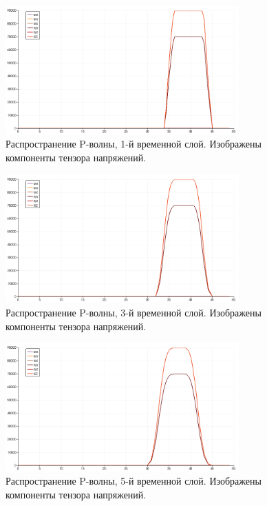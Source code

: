 \begin{figure}[htp]
\centering
\includegraphics[width=0.8\textwidth]{png/p-wave-test/s/0001.png}
\caption{Распространение P-волны, 1-й временной слой. Изображены компоненты тензора напряжений.}
\label{pic:p_wave_1}
\end{figure}

\begin{figure}[htp]
\centering
\includegraphics[width=0.8\textwidth]{png/p-wave-test/s/0003.png}
\caption{Распространение P-волны, 3-й временной слой. Изображены компоненты тензора напряжений.}
\end{figure}

\begin{figure}[htp]
\centering
\includegraphics[width=0.8\textwidth]{png/p-wave-test/s/0005.png}
\caption{Распространение P-волны, 5-й временной слой. Изображены компоненты тензора напряжений.}
\end{figure}

